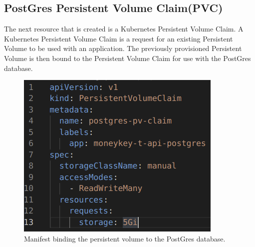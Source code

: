 \begin{flushleft}
    \subsection{PostGres Persistent Volume Claim(PVC)}
    The next resource that is created is a Kubernetes Persistent Volume Claim. A Kubernetes Persistent Volume Claim is a request for an existing Persistent Volume to be used
    with an application. The previously provisioned Persistent Volume is then bound to the Persistent Volume Claim for use with the PostGres database. \newline
    \begin{figure} [ht]
        \begin{center}
            \includegraphics[width=.4\textwidth]{figures/postgres-pvc.png}
            \caption{Manifest binding the persistent volume to the PostGres database.}
            \label{fig: 2.8}
        \end{center}
    \end{figure}
    \pagebreak

\end{flushleft}
